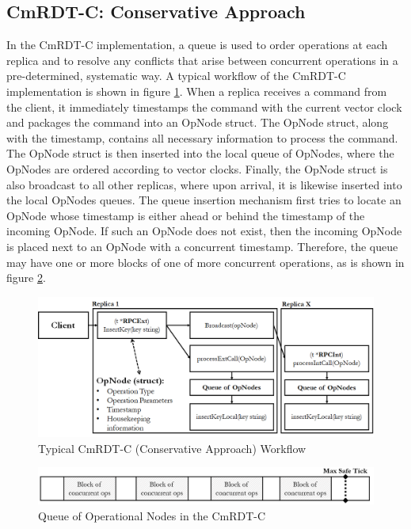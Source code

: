 \documentclass[sigconf,nonacm,10pt]{acmart}
\begin{document}
\subsection{CmRDT-C: Conservative Approach}
In the CmRDT-C implementation, a queue is used to order operations at each replica and to resolve any conflicts that arise between concurrent operations in a pre-determined, systematic way. A typical workflow of the CmRDT-C implementation is shown in figure \ref{fig:cmrdtq1}. When a replica receives a command from the client, it immediately timestamps the command with the current vector clock and packages the command into an OpNode struct. The OpNode struct, along with the timestamp, contains all necessary information to process the command. The OpNode struct is then inserted into the local queue of OpNodes, where the OpNodes are ordered according to vector clocks. Finally, the OpNode struct is also broadcast to all other replicas, where upon arrival, it is likewise inserted into the local OpNodes queues. The queue insertion mechanism first tries to locate an OpNode whose timestamp is either ahead or behind the timestamp of the incoming OpNode. If such an OpNode does not exist, then the incoming OpNode is placed next to an OpNode with a concurrent timestamp. Therefore, the queue may have one or more blocks of one of more concurrent operations, as is shown in figure \ref{fig:cmrdtq2}.

\begin{figure}[h]
  \centering
  \includegraphics[width=15.5cm]{Fig5CmRDTQ1}
  \caption{Typical CmRDT-C (Conservative Approach) Workflow}
  \label{fig:cmrdtq1}
\end{figure}

\begin{figure}[h]
  \centering
  \includegraphics[width=15.5cm]{Fig6CmRDTQ2}
  \caption{Queue of Operational Nodes in the CmRDT-C}
  \label{fig:cmrdtq2}
\end{figure}
\end{document}

